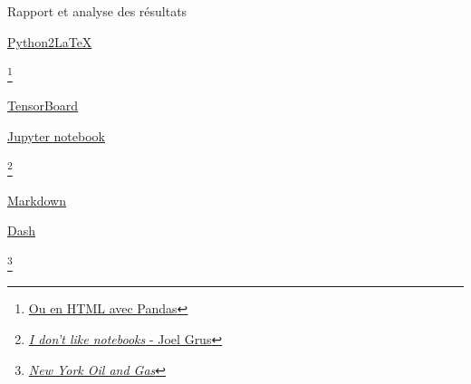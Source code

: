 \documentclass[aspectratio=169,10pt,xcolor=x11names,english,french]{beamer}
\begin{document}
	\begin{frame}{Rapport et analyse des résultats}
		\begin{minipage}{0.18\linewidth}
			\centering
			\fontsize{35}{35}\faGithub\vfill
			\vspace{3em}
			\normalsize\href{https://github.com/jsleb333/python2latex}{Python2LaTeX}
		\end{minipage}\footnote{\href{https://pythonexamples.org/pandas-render-dataframe-as-html-table/}{Ou en HTML avec Pandas}}
		\begin{minipage}{0.18\linewidth}
			\centering
			 \vfil
			\vspace{1.5em}
			\href{https://www.tensorflow.org/tensorboard?hl=fr}{TensorBoard}
		\end{minipage}
		\begin{minipage}{0.18\linewidth}
			\centering
			 \vfil
			\vspace{1.5em}
			\href{https://jupyter.org/}{Jupyter notebook}
		\end{minipage}\footnote{\href{https://www.youtube.com/watch?v=7jiPeIFXb6U}{\textit{I don't like notebooks} - Joel Grus}}
		\begin{minipage}{0.18\linewidth}
			\centering
			 \vfil
			\vspace{2.6em}
			\href{https://fr.wikipedia.org/wiki/Markdown}{Markdown}
		\end{minipage}
		\begin{minipage}{0.18\linewidth}
			\centering
			 \vfil
			\vspace{3.5em}
			\href{https://dash.plotly.com/}{Dash}
		\end{minipage}\footnote{\href{https://dash-gallery.plotly.host/dash-oil-and-gas/}{\textit{New York Oil and Gas}}}
	\end{frame}
\end{document}
